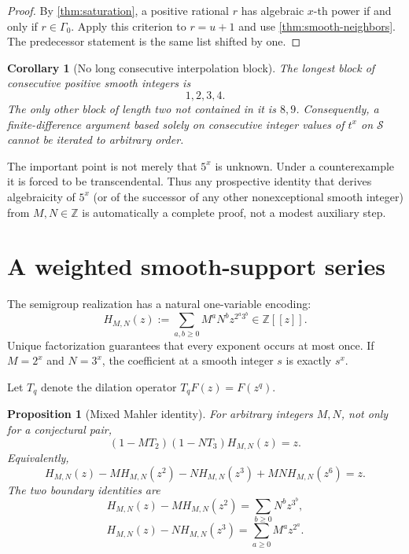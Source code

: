 \documentclass[11pt]{article}
\newtheorem{proposition}[theorem]{Proposition}
\newtheorem{corollary}[theorem]{Corollary}
\theoremstyle{definition}
\newcommand{\Z}{\mathbb{Z}}
\newcommand{\smooth}{\mathcal{S}}
\newcommand{\Gammao}{\Gamma_0}
\begin{document}
\begin{proof}
By \cref{thm:saturation}, a positive rational $r$ has algebraic $x$-th power
if and only if $r\in\Gammao$.  Apply this criterion to $r=u+1$ and use
\cref{thm:smooth-neighbors}.  The predecessor statement is the same list
shifted by one.
\end{proof}

\begin{corollary}[No long consecutive interpolation block]
The longest block of consecutive positive smooth integers is
\[
              1,2,3,4.
\]
The only other block of length two not contained in it is $8,9$.
Consequently, a finite-difference argument based solely on consecutive
integer values of $t^x$ on $\smooth$ cannot be iterated to arbitrary order.
\end{corollary}

The important point is not merely that $5^x$ is unknown.  Under a
counterexample it is forced to be transcendental.  Thus any prospective
identity that derives algebraicity of $5^x$ (or of the successor of any other
nonexceptional smooth integer) from $M,N\in\Z$ is automatically a complete
proof, not a modest auxiliary step.

\section{A weighted smooth-support series}

The semigroup realization has a natural one-variable encoding:
\begin{equation}
\label{eq:weighted-series}
 H_{M,N}(z):=
 \sum_{a,b\geq0}M^aN^b z^{2^a3^b}\in\Z[[z]].
\end{equation}
Unique factorization guarantees that every exponent occurs at most once.  If
$M=2^x$ and $N=3^x$, the coefficient at a smooth integer $s$ is exactly $s^x$.

Let $T_q$ denote the dilation operator $T_qF(z)=F(z^q)$.

\begin{proposition}[Mixed Mahler identity]
\label{prop:mixed-mahler}
For arbitrary integers $M,N$, not only for a conjectural pair,
\[
       (1-MT_2)(1-NT_3)H_{M,N}(z)=z.
\]
Equivalently,
\[
 H_{M,N}(z)-M H_{M,N}(z^2)-N H_{M,N}(z^3)
       +MN H_{M,N}(z^6)=z.
\]
The two boundary identities are
\[
 H_{M,N}(z)-M H_{M,N}(z^2)=\sum_{b\geq0}N^b z^{3^b},
\]
\[
 H_{M,N}(z)-N H_{M,N}(z^3)=\sum_{a\geq0}M^a z^{2^a}.
\]
\end{proposition}
\end{document}
